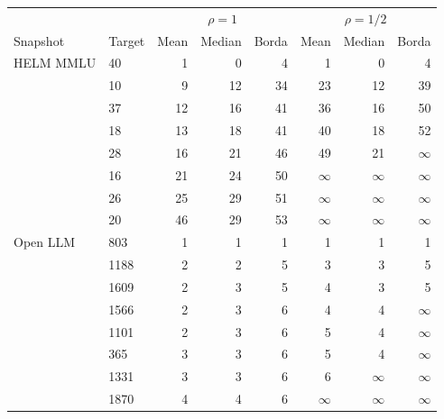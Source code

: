 \begin{tabular}{llrrrrrr}
\toprule
 & & \multicolumn{3}{c}{$\rho=1$} & \multicolumn{3}{c}{$\rho=1/2$} \\
Snapshot & Target & Mean & Median & Borda & Mean & Median & Borda \\
\midrule
HELM MMLU & 40 & 1 & 0 & 4 & 1 & 0 & 4 \\
 & 10 & 9 & 12 & 34 & 23 & 12 & 39 \\
 & 37 & 12 & 16 & 41 & 36 & 16 & 50 \\
 & 18 & 13 & 18 & 41 & 40 & 18 & 52 \\
 & 28 & 16 & 21 & 46 & 49 & 21 & $\infty$ \\
 & 16 & 21 & 24 & 50 & $\infty$ & $\infty$ & $\infty$ \\
 & 26 & 25 & 29 & 51 & $\infty$ & $\infty$ & $\infty$ \\
 & 20 & 46 & 29 & 53 & $\infty$ & $\infty$ & $\infty$ \\
\midrule
Open LLM & 803 & 1 & 1 & 1 & 1 & 1 & 1 \\
 & 1188 & 2 & 2 & 5 & 3 & 3 & 5 \\
 & 1609 & 2 & 3 & 5 & 4 & 3 & 5 \\
 & 1566 & 2 & 3 & 6 & 4 & 4 & $\infty$ \\
 & 1101 & 2 & 3 & 6 & 5 & 4 & $\infty$ \\
 & 365 & 3 & 3 & 6 & 5 & 4 & $\infty$ \\
 & 1331 & 3 & 3 & 6 & 6 & $\infty$ & $\infty$ \\
 & 1870 & 4 & 4 & 6 & $\infty$ & $\infty$ & $\infty$ \\
\bottomrule
\end{tabular}
